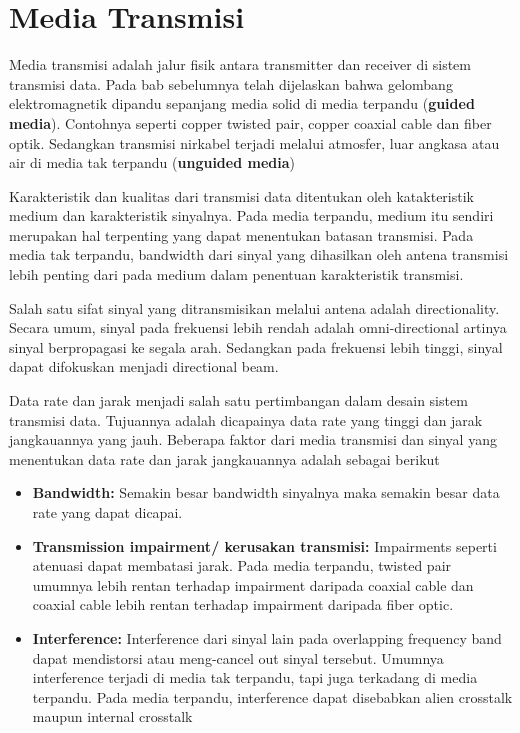 \chapter{Media Transmisi}

Media transmisi adalah jalur fisik antara transmitter dan receiver di sistem transmisi data. Pada bab sebelumnya telah dijelaskan bahwa gelombang elektromagnetik dipandu sepanjang media solid di media terpandu (\textbf{guided media}). Contohnya seperti copper twisted pair, copper coaxial cable dan fiber optik. Sedangkan transmisi nirkabel terjadi melalui atmosfer, luar angkasa atau air di media tak terpandu (\textbf{unguided media})

Karakteristik dan kualitas dari transmisi data ditentukan oleh katakteristik medium dan karakteristik sinyalnya. Pada media terpandu, medium itu sendiri merupakan hal terpenting yang dapat menentukan batasan transmisi. Pada media tak terpandu, bandwidth dari sinyal yang dihasilkan oleh antena transmisi lebih penting dari pada medium dalam penentuan karakteristik transmisi.

Salah satu sifat sinyal yang ditransmisikan melalui antena adalah directionality. Secara umum, sinyal pada frekuensi lebih rendah adalah omni-directional artinya sinyal berpropagasi ke segala arah. Sedangkan pada frekuensi lebih tinggi, sinyal dapat difokuskan menjadi directional beam.

Data rate dan jarak menjadi salah satu pertimbangan dalam desain sistem transmisi data. Tujuannya adalah dicapainya data rate yang tinggi dan jarak jangkauannya yang jauh.  Beberapa faktor dari media transmisi dan sinyal yang menentukan data rate dan jarak jangkauannya adalah sebagai berikut

\begin{itemize}
	\item \textbf{Bandwidth:} Semakin besar bandwidth sinyalnya maka semakin besar data rate yang dapat dicapai.
	\item \textbf{Transmission impairment/ kerusakan transmisi: } Impairments seperti atenuasi dapat membatasi jarak. Pada media terpandu, twisted pair umumnya lebih rentan terhadap impairment daripada coaxial cable dan coaxial cable lebih rentan terhadap impairment daripada fiber optic.
	\item \textbf{Interference:} Interference dari sinyal lain pada overlapping frequency band dapat mendistorsi atau meng-cancel out sinyal tersebut. Umumnya interference terjadi di media tak terpandu, tapi juga terkadang di media terpandu. Pada media terpandu, interference dapat disebabkan alien crosstalk maupun internal crosstalk
\end{itemize}

